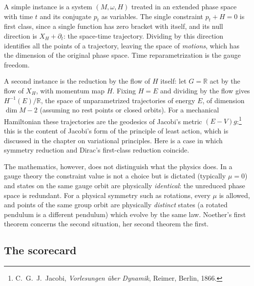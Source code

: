 A simple instance is a system $(M,\omega,H)$ treated in an extended phase space with time $t$ and its conjugate $p_t$ as variables. The single constraint $p_t+H=0$ is first class, since a single function has zero bracket with itself, and its null direction is $X_H+\partial_t$: the space-time trajectory. Dividing by this direction identifies all the points of a trajectory, leaving the space of \emph{motions}, which has the dimension of the original phase space. Time reparametrization is the gauge freedom.

A second instance is the reduction by the flow of $H$ itself: let $G=\mathbb R$ act by the flow of $X_H$, with momentum map $H$. Fixing $H=E$ and dividing by the flow gives $H^{-1}(E)/\mathbb R$, the space of unparametrized trajectories of energy $E$, of dimension $\dim M-2$ (assuming no rest points or closed orbits). For a mechanical Hamiltonian these trajectories are the geodesics of Jacobi's metric $(E-V)g$:\footnote{C.\ G.\ J.\ Jacobi, \emph{Vorlesungen \"uber Dynamik}, Reimer, Berlin, 1866.} this is the content of Jacobi's form of the principle of least action, which is discussed in the chapter on variational principles. Here is a case in which symmetry reduction and Dirac's first-class reduction coincide.

The mathematics, however, does not distinguish what the physics does. In a gauge theory the constraint value is not a choice but is dictated (typically $\mu=0$) and states on the same gauge orbit are physically \emph{identical}: the unreduced phase space is redundant. For a physical symmetry such as rotations, every $\mu$ is allowed, and points of the same group orbit are physically \emph{distinct} states (a rotated pendulum is a different pendulum) which evolve by the same law. Noether's first theorem concerns the second situation, her second theorem the first.

\subsection{The scorecard}\label{rd:sec:score}

